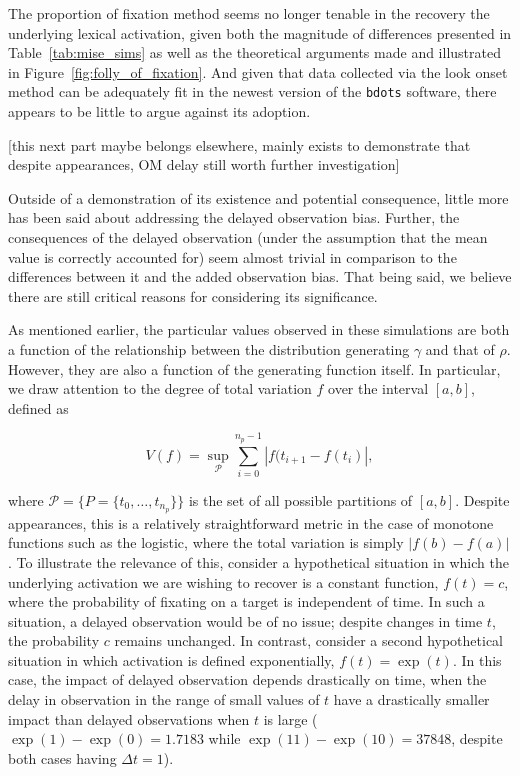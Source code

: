 \documentclass{article}
\newcommand{\xt}{\texttt}%
\begin{document}
The proportion of fixation method seems no longer tenable in the recovery the underlying lexical activation, given both the magnitude of differences presented in Table~\ref{tab:mise_sims} as well as the theoretical arguments made and illustrated in Figure~\ref{fig:folly_of_fixation}. And given that data collected via the look onset method can be adequately fit in the newest version of the \xt{bdots} software, there appears to be little to argue against its adoption.

[this next part maybe belongs elsewhere, mainly exists to demonstrate that despite appearances, OM delay still worth further investigation]

Outside of a demonstration of its existence and potential consequence, little more has been said about addressing the delayed observation bias. Further, the consequences of the delayed observation (under the assumption that the mean value is correctly accounted for) seem almost trivial in comparison to the differences between it and the added observation bias. That being said, we believe there are still critical reasons for considering its significance.

As mentioned earlier, the particular values observed in these simulations are both a function of the relationship between the distribution generating $\gamma$ and that of $\rho$. However, they are also a function of the generating function itself. In particular, we draw attention to the degree of total variation $f$ over the interval $[a,b]$, defined as 

\begin{equation}
V(f) = \underset{\mathcal{P}}{\sup} \sum_{i=0}^{n_p-1} \left|f(t_{i+1} - f(t_i) \right|,
\end{equation}

where $\mathcal{P} = \{P = \{t_0, \dots, t_{n_p}\} \}$ is the set of all possible partitions of $[a,b]$. Despite appearances, this is a relatively straightforward metric in the case of monotone functions such as the logistic, where the total variation is simply $|f(b) - f(a)|$. To illustrate the relevance of this, consider a hypothetical situation in which the underlying activation we are wishing to recover is a constant function, $f(t) = c$, where the probability of fixating on a target is independent of time. In such a situation, a delayed observation would be of no issue; despite changes in time $t$, the probability $c$ remains unchanged. In contrast, consider a second hypothetical situation in which activation is defined exponentially, $f(t) = \exp(t)$. In this case, the impact of delayed observation depends drastically on time, when the delay in observation in the range of small values of $t$ have a drastically smaller impact than delayed observations when $t$ is large ($\exp(1) - \exp(0) = 1.7183$ while $\exp(11) - \exp(10) = 37848$, despite both cases having $\Delta t = 1$).
\end{document}
